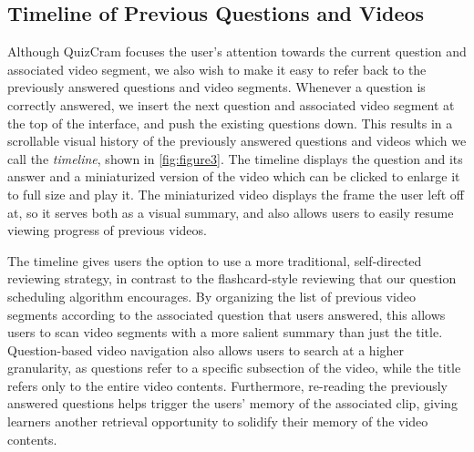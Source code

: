\documentclass{chi-ext}
\begin{document}

\subsection{Timeline of Previous Questions and Videos}

Although QuizCram focuses the user's attention towards the current question and associated video segment, we also wish to make it easy to refer back to the previously answered questions and video segments. Whenever a question is correctly answered, we insert the next question and associated video segment at the top of the interface, and push the existing questions down. This results in a scrollable visual history of the previously answered questions and videos which we call the \emph{timeline}, shown in \autoref{fig:figure3}. The timeline displays the question and its answer and a miniaturized version of the video which can be clicked to enlarge it to full size and play it. The miniaturized video displays the frame the user left off at, so it serves both as a visual summary, and also allows users to easily resume viewing progress of previous videos. %

The timeline gives users the option to use a more traditional, self-directed reviewing strategy, in contrast to the flashcard-style reviewing that our question scheduling algorithm encourages. By organizing the list of previous video segments according to the associated question that users answered, this allows users to scan video segments with a more salient summary than just the title. Question-based video navigation also allows users to search at a higher granularity, as questions refer to a specific subsection of the video, while the title refers only to the entire video contents. Furthermore, re-reading the previously answered questions helps trigger the users' memory of the associated clip, giving learners another retrieval opportunity to solidify their memory of the video contents.
\end{document}
